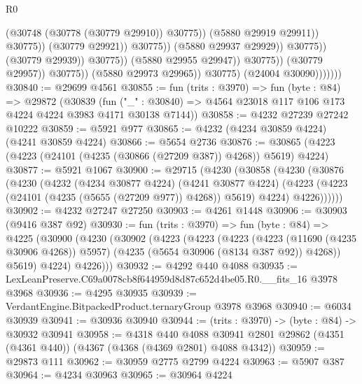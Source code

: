 \begin{lexlean}{R0}
\begin{coremodule}
                                                          (@30748 (@30778 (@30779 @29910)) @30775))
                                                        (@5880 @29919 @29911))
                                                      @30775))
                                                  (@30779 @29921))
                                                @30775))
                                            (@5880 @29937 @29929))
                                          @30775))
                                      (@30779 @29939))
                                    @30775))
                                (@5880 @29955 @29947))
                              @30775))
                          (@30779 @29957))
                        @30775))
                    (@5880 @29973 @29965))
                  @30775)
                (@24004 @30090)))))))
@30840 := @29699 @4561
@30855 := fun (trits : @3970) =>
  fun (byte : @84) =>
  @29872
    (@30839
      (fun ("_" : @30840) => @4564 @23018 @117 @106 @173 @4224 @4224 @3983 @4171 @30138 @7144))
@30858 := @4232 @27239 @27242 @10222
@30859 := @5921 @977
@30865 := @4232 (@4234 @30859 @4224) (@4241 @30859 @4224)
@30866 := @5654 @2736
@30876 := @30865 (@4223 (@4223 (@24101 (@4235 (@30866 (@27209 @387)) @4268)) @5619) @4224)
@30877 := @5921 @1067
@30900 := @29715
    (@4230
      (@30858
        (@4230
          (@30876
            (@4230
              (@4232
                (@4234 @30877 @4224)
                (@4241 @30877 @4224)
                (@4223 (@4223 (@24101 (@4235 (@5655 (@27209 @977)) @4268)) @5619) @4224)
                @4226))))))
@30902 := @4232 @27247 @27250
@30903 := @4261 @1448
@30906 := @30903 (@9416 @387 @92)
@30930 := fun (trits : @3970) =>
  fun (byte : @84) =>
  @4225
    (@30900
      (@4230
        (@30902
          (@4223
            (@4223
              (@4223
                (@4223 (@11690 (@4235 @30906 @4268)) @5957)
                (@4235 (@5654 @30906 (@8134 @387 @92)) @4268))
              @5619)
            @4224)
          @4226)))
@30932 := @4292 @440 @4088
@30935 := LexLeanPreserve.C69a0078cb8f644959d8d87c652d4be05.R0.__fits_16 @3978 @3968
@30936 := @4295 @30935
@30939 := VerdantEngine.BitpackedProduct.ternaryGroup @3978 @3968
@30940 := @6034 @30939
@30941 := @30936 @30940
@30944 := (trits : @3970) -> (byte : @84) -> @30932 @30941
@30958 := @4318
    @440
    @4088
    @30941
    @2801
    @29862
    (@4351 (@4361 @440))
    (@4367 (@4368 (@4369 @2801) @4088 @4342))
@30959 := @29873 @111
@30962 := @30959 @2775 @2799 @4224
@30963 := @5907 @387
@30964 := @4234 @30963
@30965 := @30964 @4224

\end{coremodule}
\end{lexlean}
